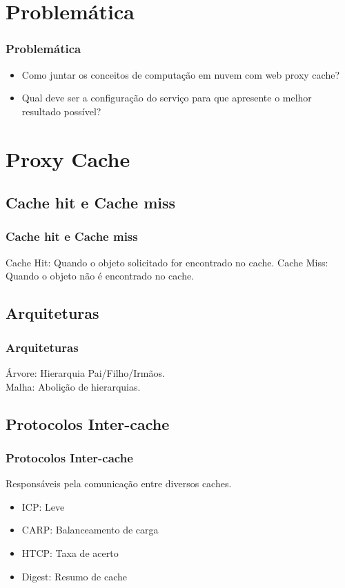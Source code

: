 \documentclass{beamer}
\begin{document}
    \section{Problemática}
    \begin{frame}
     \frametitle{Problemática}
     \begin{itemize}
       \item Como juntar os conceitos de computação em nuvem com web proxy cache?
       \item Qual deve ser a configuração do serviço para que apresente o melhor resultado possível?
      \end{itemize}
    \end{frame}
    \section{Proxy Cache}
    \subsection{Cache hit e Cache miss}
    \begin{frame}
      \frametitle{Cache hit e Cache miss}
      Cache Hit: Quando o objeto solicitado for encontrado no cache.
      Cache Miss: Quando o objeto não é encontrado no cache.
    \end{frame}

   \subsection{Arquiteturas}
    \begin{frame}
      \frametitle{Arquiteturas}
      Árvore: Hierarquia Pai/Filho/Irmãos.\\
      Malha: Abolição de hierarquias.
    \end{frame}

    \subsection{Protocolos Inter-cache}
    \begin{frame}
      \frametitle{Protocolos Inter-cache}
      Responsáveis pela comunicação entre diversos caches.
      \begin{itemize}
       \item ICP: Leve
       \item CARP: Balanceamento de carga
       \item HTCP: Taxa de acerto
       \item Digest: Resumo de cache
      \end{itemize} 
    \end{frame} 
\end{document}
